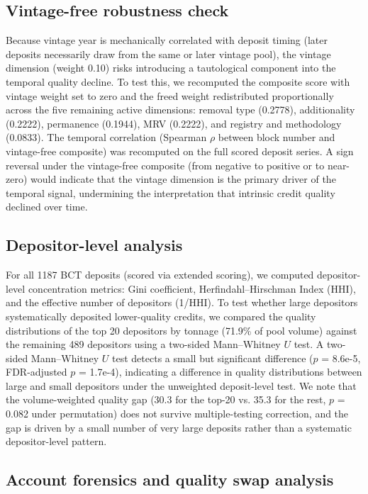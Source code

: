 \documentclass[11pt]{article}
\begin{document}
\subsection*{Vintage-free robustness check}

Because vintage year is mechanically correlated with deposit timing (later deposits necessarily draw from the same or later vintage pool), the vintage dimension (weight 0.10) risks introducing a tautological component into the temporal quality decline. To test this, we recomputed the composite score with vintage weight set to zero and the freed weight redistributed proportionally across the five remaining active dimensions: removal type (0.2778), additionality (0.2222), permanence (0.1944), MRV (0.2222), and registry and methodology (0.0833). The temporal correlation (Spearman $\rho$ between block number and vintage-free composite) was recomputed on the full scored deposit series. A sign reversal under the vintage-free composite (from negative to positive or to near-zero) would indicate that the vintage dimension is the primary driver of the temporal signal, undermining the interpretation that intrinsic credit quality declined over time.

\subsection*{Depositor-level analysis}

For all 1187 BCT deposits (scored via extended scoring), we computed depositor-level concentration metrics: Gini coefficient, Herfindahl--Hirschman Index (HHI), and the effective number of depositors (1/HHI). To test whether large depositors systematically deposited lower-quality credits, we compared the quality distributions of the top 20 depositors by tonnage (71.9\% of pool volume) against the remaining 489 depositors using a two-sided Mann--Whitney $U$ test. A two-sided Mann--Whitney $U$ test detects a small but significant difference ($p$ = 8.6e-5, FDR-adjusted $p$ = 1.7e-4), indicating a difference in quality distributions between large and small depositors under the unweighted deposit-level test. We note that the volume-weighted quality gap (30.3 for the top-20 vs. 35.3 for the rest, $p$ = 0.082 under permutation) does not survive multiple-testing correction, and the gap is driven by a small number of very large deposits rather than a systematic depositor-level pattern.

\subsection*{Account forensics and quality swap analysis}
\end{document}
